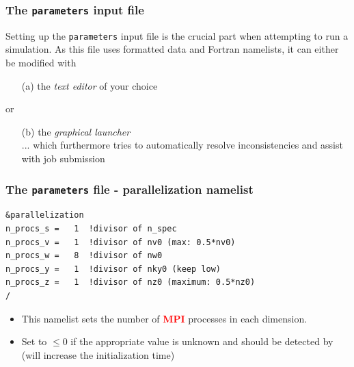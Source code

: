 \documentclass[9pt]{beamer}
\newcommand{\cR}[1]{\textcolor{red}{#1}}
\begin{document}

\begin{frame}[fragile]
   \frametitle{The {\tt parameters} input file}

\begin{exampleblock}{}
Setting up the {\tt parameters} input file is the crucial part when attempting to run a simulation.
As this file uses formatted data and Fortran namelists, it can either be modified with
\begin{itemize}
 \item[(a)] the {\em text editor} of your choice
\end{itemize}
or
\begin{itemize}
 \item[(b)] the {\em graphical launcher}\\
... which furthermore tries to automatically resolve inconsistencies and assist with job submission
\end{itemize}
\end{exampleblock}
\end{frame}




\begin{frame}[fragile] %
  \frametitle{The {\tt parameters} file - parallelization namelist}

\begin{block} %

\begin{block}

\begin{verbatim}
&parallelization
n_procs_s =   1  !divisor of n_spec
n_procs_v =   1  !divisor of nv0 (max: 0.5*nv0)
n_procs_w =   8  !divisor of nw0
n_procs_y =   1  !divisor of nky0 (keep low)
n_procs_z =   1  !divisor of nz0 (maximum: 0.5*nz0)
/
\end{verbatim}

\end{block}
\begin{itemize}
\item This namelist sets the number of \cR{\bf MPI} processes in each dimension.
\item Set to $\leq 0$ if the appropriate value is unknown and should be detected by \gene (will increase the initialization time)
\end{itemize}
\end{block}

\end{frame}
\end{document}
